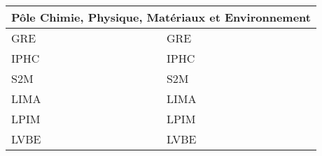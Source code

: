 
\begin{tabularx}{\linewidth}{lX}
	\toprule
	\multicolumn{2}{c}{Pôle Chimie, Physique, Matériaux et Environnement}\\
	\midrule
	\acrshort{GRE} & \acrlong{GRE}\\
	\acrshort{IPHC} & \acrlong{IPHC}\\
	\acrshort{S2M} & \acrlong{S2M}\\
	\acrshort{LIMA} & \acrlong{LIMA}\\
	\acrshort{LPIM} & \acrlong{LPIM}\\
	\acrshort{LVBE} & \acrlong{LVBE}\\
	\bottomrule
\end{tabularx}
